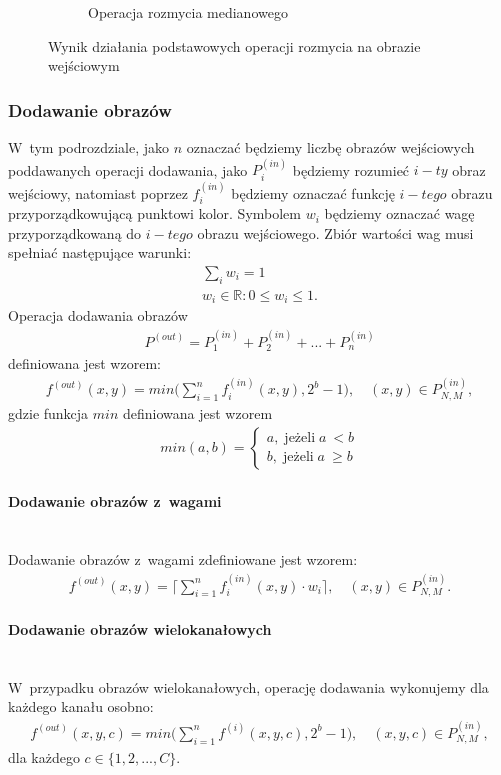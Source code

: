 \begin{figure}
\begin{subfigure}[b]{0.45\textwidth}
    \caption{Operacja rozmycia medianowego}
    \label{fig:smooth_lena_gauss}
  \end{subfigure}
  \caption{Wynik działania podstawowych operacji rozmycia na obrazie wejściowym}
  \label{fig:lena_smooth}
\end{figure}
\subsubsection{Dodawanie obrazów}
 W~tym podrozdziale, jako $n$ oznaczać będziemy liczbę obrazów wejściowych poddawanych operacji dodawania, jako $P^{(in)}_{i}$ będziemy rozumieć $i-ty$ obraz wejściowy, natomiast poprzez $f^{(in)}_i$ będziemy oznaczać funkcję $i-tego$ obrazu przyporządkowującą punktowi kolor. Symbolem $w_i$ będziemy oznaczać wagę przyporządkowaną do $i-tego$ obrazu wejściowego. Zbiór wartości wag  musi spełniać następujące warunki:
\begin{gather*}
  \displaystyle\sum_i w_i = 1\\
  w_i \in \mathbb{R}: 0 \leqslant w_i \leqslant 1.
\end{gather*}
Operacja dodawania obrazów 
\begin{gather*}
P^{(out)} = P_1^{(in)} + P_2^{(in)} + ... + P_n^{(in)}
\end{gather*}
definiowana jest wzorem:
\begin{gather*}
  f^{(out)}(x, y) = min\big(\displaystyle\sum_{i=1}^{n} f^{(in)}_i(x, y), 2^b-1\big), \quad (x, y) \in P^{(in)}_{N,M},
\end{gather*} gdzie funkcja $min$ definiowana jest wzorem
\begin{gather*}
  min(a, b) = \left\{\begin{matrix}
  a, \; \text{jeżeli} \; a~< b \\
  b, \; \text{jeżeli} \; a~\geqslant b
  \end{matrix}\right. 
\end{gather*}
\paragraph{Dodawanie obrazów z~wagami} \mbox{}\\
Dodawanie obrazów z~wagami zdefiniowane jest wzorem:
\begin{gather*}
  f^{(out)}(x, y) = \big\lceil \displaystyle\sum_{i=1}^{n} f^{(in)}_i(x, y) \cdot w_i\big\rceil, \quad (x, y) \in P^{(in)}_{N,M}.
\end{gather*}
\paragraph{Dodawanie obrazów wielokanałowych} \mbox{}\\
 W~przypadku obrazów wielokanałowych, operację dodawania wykonujemy dla każdego kanału osobno:
\begin{gather*}
  f^{(out)}(x, y, c) = min\big(\displaystyle\sum_{i=1}^{n} f^{(i)}(x, y, c), 2^b-1\big), \quad (x, y, c) \in P^{(in)}_{N,M},
\end{gather*}
dla każdego $c \in \{1, 2, ..., C\}$.
